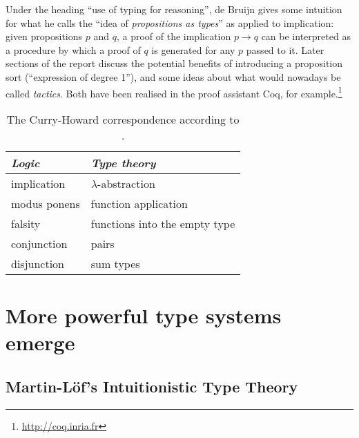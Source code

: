 \documentclass[12pt,toc=bibliography,numbers=noendperiod,
               footnotes=multiple,twoside]{scrartcl}
\begin{document}
Under the heading \enquote{use of typing for reasoning}, de Bruijn gives some intuition for what he calls the \enquote{idea of \emph{propositions as types}} as applied to implication: given propositions \(p\) and \(q\), a proof of the implication \(p \rightarrow q\) can be interpreted as a procedure by which a proof of \(q\) is generated for any \(p\) passed to it. Later sections of the report discuss the potential benefits of introducing a proposition sort (\enquote{expression of degree 1}), and some ideas about what would nowadays be called \emph{tactics}. Both have been realised in the proof assistant Coq, for example.\footnote{\url{http://coq.inria.fr}}

\begin{table}[h]
    \centering
    \begin{tabular}{l l}
        \toprule
        \textit{Logic} & \textit{Type theory} \\
        \midrule
	implication & \(\lambda\)-abstraction \\
	modus ponens & function application \\
	falsity & functions into the empty type \\
	conjunction & pairs \\
	disjunction & sum types \\
        \bottomrule
    \end{tabular}
    \caption{The Curry-Howard correspondence according to \textcite{howard_formulae-as-types_1980}.}
    \label{tab:howard}
\end{table}


\section{More powerful type systems emerge}

\subsection{Martin-Löf's Intuitionistic Type Theory}
\end{document}
